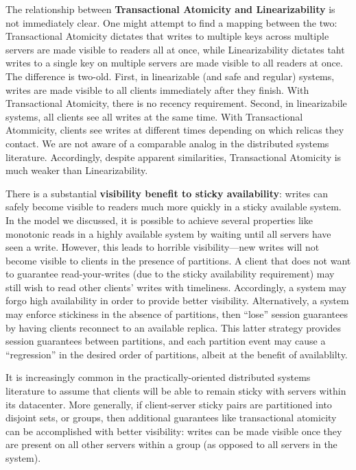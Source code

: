 \noindent The relationship between \textbf{Transactional Atomicity and
  Linearizability} is not immediately clear. One might attempt to find
a mapping between the two: Transactional Atomicity dictates that
writes to multiple keys across multiple servers are made visible to
readers all at once, while Linearizability dictates taht writes to a
single key on multiple servers are made visible to all readers at
once. The difference is two-old. First, in linearizable (and safe and
regular) systems, writes are made visible to all clients immediately
after they finish. With Transactional Atomicity, there is no recency
requirement. Second, in linearizabile systems, all clients see all
writes at the same time. With Transactional Atommicity, clients see
writes at different times depending on which relicas they contact. We
are not aware of a comparable analog in the distributed systems
literature. Accordingly, despite apparent similarities, Transactional
Atomicity is much weaker than Linearizability.

\noindent There is a substantial \textbf{visibility benefit to sticky
  availability}: writes can safely become visible to readers much more
quickly in a sticky available system. In the model we discussed, it is
possible to achieve several properties like monotonic reads in a
highly available system by waiting until all servers have seen a
write. However, this leads to horrible visibility---new writes will
not become visible to clients in the presence of partitions. A client
that does not want to guarantee read-your-writes (due to the sticky
availability requirement) may still wish to read other clients' writes
with timeliness. Accordingly, a system may forgo high availability in
order to provide better visibility. Alternatively, a system may
enforce stickiness in the absence of partitions, then ``lose'' session
guarantees by having clients reconnect to an available replica. This
latter strategy provides session guarantees between partitions, and
each partition event may cause a ``regression'' in the desired order
of partitions, albeit at the benefit of availablilty.

It is increasingly common in the practically-oriented distributed
systems literature to assume that clients will be able to remain
sticky with servers within its datacenter. More generally, if
client-server sticky pairs are partitioned into disjoint sets, or
groups, then additional guarantees like transactional atomicity can be
accomplished with better visibility: writes can be made visible once
they are present on all other servers within a group (as opposed to
all servers in the system).


